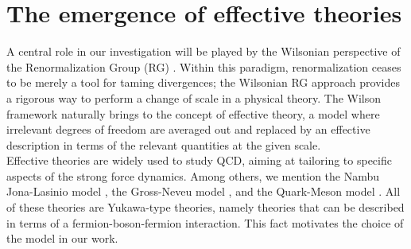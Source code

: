 \section{The emergence of effective theories}
A central role in our investigation will be played by the Wilsonian perspective of the Renormalization Group (RG) \cite{WilsonRG1,WilsonRG2,WILSON197475}. Within this paradigm, renormalization ceases to be merely a tool for taming divergences; 
the Wilsonian RG approach provides a rigorous way to perform a change of scale in a physical theory. The Wilson framework naturally brings to the concept of effective theory, a model where irrelevant degrees of freedom are averaged out and replaced by an effective description in terms of the relevant quantities at the given scale.  \\
Effective theories are widely used to study QCD, aiming at tailoring to specific aspects of the strong force dynamics. 
Among others, we mention the Nambu \textendash{} Jona-Lasinio model \cite{Nambu1961DynamicalI, Nambu1961DynamicalII}, the Gross-Neveu model \cite{grossneveu}, and the Quark-Meson model \cite{quarkmeson1,quarkmeson2,quarkmeson3}. All of these theories are Yukawa-type theories, namely theories that can be described in terms of a fermion-boson-fermion interaction. This fact motivates the choice of the model in our work.

\newpage
